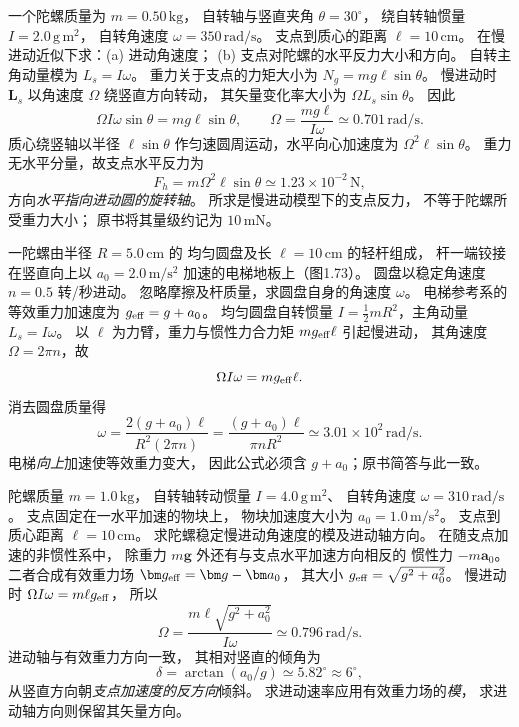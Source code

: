 一个陀螺质量为 $m=0.50\,\mathrm{kg}$，
自转轴与竖直夹角 $\theta=30^\circ$，
绕自转轴惯量 $I=2.0\,\mathrm{g\,m^2}$，
自转角速度 $\omega=350\,\mathrm{rad/s}$。
支点到质心的距离 $\ell=10\,\mathrm{cm}$。
在慢进动近似下求：(a) 进动角速度；
(b) 支点对陀螺的水平反力大小和方向。
\exsolution
自转主角动量模为 $L_s=I\omega$。
重力关于支点的力矩大小为
$N_g=mg\ell\sin\theta$。
慢进动时 $\bm L_s$ 以角速度 $\Omega$
绕竖直方向转动，
其矢量变化率大小为 $\Omega L_s\sin\theta$。
因此
\[
\Omega I\omega\sin\theta=mg\ell\sin\theta,
\qquad
\boxed{\Omega=\frac{mg\ell}{I\omega}
\simeq0.701\,\mathrm{rad/s}}.
\]
质心绕竖轴以半径 $\ell\sin\theta$
作匀速圆周运动，水平向心加速度为
$\Omega^2\ell\sin\theta$。
重力无水平分量，故支点水平反力为
\[
\boxed{F_h=m\Omega^2\ell\sin\theta
\simeq1.23\times10^{-2}\,\mathrm N},
\]
方向\emph{水平指向进动圆的旋转轴}。
\excheck 所求是慢进动模型下的支点反力，
不等于陀螺所受重力大小；
原书将其量级约记为 $10\,\mathrm{mN}$。

一陀螺由半径 $R=5.0\,\mathrm{cm}$ 的
均匀圆盘及长 $\ell=10\,\mathrm{cm}$ 的轻杆组成，
杆一端铰接在竖直向上以
$a_0=2.0\,\mathrm{m/s^2}$ 加速的电梯地板上（图1.73）。
圆盘以稳定角速度
$n=0.5$ 转/秒进动。
忽略摩擦及杆质量，求圆盘自身的角速度 $\omega$。
\exsolution
电梯参考系的等效重力加速度为
$g_{\rm eff}=g+a_0$。
均匀圆盘自转惯量
$I=\frac12mR^2$，主角动量
$L_s=I\omega$。
以 $\ell$ 为力臂，重力与惯性力合力矩
$mg_{\rm eff}\ell$ 引起慢进动，
其角速度 $\Omega=2\pi n$，故
\[
\Omega I\omega=mg_{\rm eff}\ell.
\]
消去圆盘质量得
\[
\boxed{\omega=
\frac{2(g+a_0)\ell}{R^2(2\pi n)}
=\frac{(g+a_0)\ell}{\pi nR^2}
\simeq3.01\times10^2\,\mathrm{rad/s}}.
\]
\excheck 电梯\emph{向上}加速使等效重力变大，
因此公式必须含 $g+a_0$；原书简答与此一致。

陀螺质量 $m=1.0\,\mathrm{kg}$，
自转轴转动惯量 $I=4.0\,\mathrm{g\,m^2}$、
自转角速度 $\omega=310\,\mathrm{rad/s}$。
支点固定在一水平加速的物块上，
物块加速度大小为 $a_0=1.0\,\mathrm{m/s^2}$。
支点到质心距离 $\ell=10\,\mathrm{cm}$。
求陀螺稳定慢进动角速度的模及进动轴方向。
\exsolution
在随支点加速的非惯性系中，
除重力 $m\bm g$ 外还有与支点水平加速方向相反的
惯性力 $-m\bm a_0$。
二者合成有效重力场
$\bm g_{\rm eff}=\bm g-\bm a_0$，
其大小
$g_{\rm eff}=\sqrt{g^2+a_0^2}$。
慢进动时
$\Omega I\omega=m\ell g_{\rm eff}$，
所以
\[
\boxed{\Omega=\frac{m\ell\sqrt{g^2+a_0^2}}{I\omega}
\simeq0.796\,\mathrm{rad/s}}.
\]
进动轴与有效重力方向一致，
其相对竖直的倾角为
\[
\boxed{\delta=\arctan(a_0/g)
\simeq5.82^\circ\approx6^\circ},
\]
从竖直方向朝\emph{支点加速度的反方向}倾斜。
\excheck 求进动速率应用有效重力场的\emph{模}，
求进动轴方向则保留其矢量方向。

